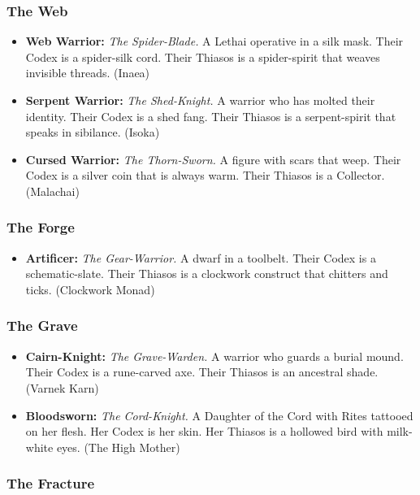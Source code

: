 \subsubsection{The Web}

\begin{itemize}
\item \textbf{Web Warrior:} \textit{The Spider-Blade.} A Lethai operative in a silk mask. Their Codex is a spider-silk cord. Their Thiasos is a spider-spirit that weaves invisible threads. (Inaea)
\item \textbf{Serpent Warrior:} \textit{The Shed-Knight.} A warrior who has molted their identity. Their Codex is a shed fang. Their Thiasos is a serpent-spirit that speaks in sibilance. (Isoka)
\item \textbf{Cursed Warrior:} \textit{The Thorn-Sworn.} A figure with scars that weep. Their Codex is a silver coin that is always warm. Their Thiasos is a Collector. (Malachai)
\end{itemize}

\subsubsection{The Forge}

\begin{itemize}
\item \textbf{Artificer:} \textit{The Gear-Warrior.} A dwarf in a toolbelt. Their Codex is a schematic-slate. Their Thiasos is a clockwork construct that chitters and ticks. (Clockwork Monad)
\end{itemize}

\subsubsection{The Grave}

\begin{itemize}
\item \textbf{Cairn-Knight:} \textit{The Grave-Warden.} A warrior who guards a burial mound. Their Codex is a rune-carved axe. Their Thiasos is an ancestral shade. (Varnek Karn)
\item \textbf{Bloodsworn:} \textit{The Cord-Knight.} A Daughter of the Cord with Rites tattooed on her flesh. Her Codex is her skin. Her Thiasos is a hollowed bird with milk-white eyes. (The High Mother)
\end{itemize}

\subsubsection{The Fracture}

